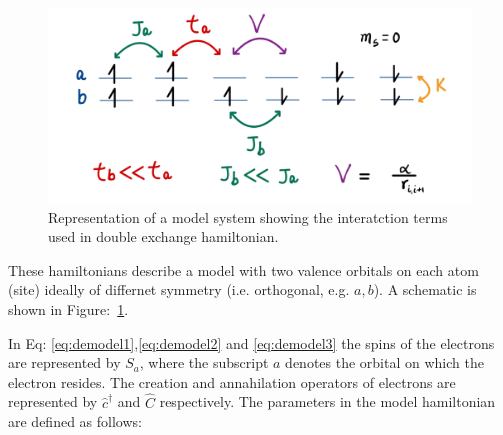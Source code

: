 \documentclass[12pt,twoside]{report}
\begin{document}
	\begin{figure}[ht]
		\centering
			\includegraphics[scale=0.2]{DE.png}
		\caption{\label{fig:deham} Representation of a model system showing the interatction terms used in double exchange hamiltonian. }
	\end{figure}
	These hamiltonians describe a model with two valence orbitals on each
	atom (site) ideally of differnet symmetry (i.e. orthogonal, e.g. $a,b$). A schematic is shown in
	Figure:~\ref{fig:deham}.
			
			
	In Eq: \ref{eq:demodel1},\ref{eq:demodel2} and \ref{eq:demodel3} the spins of the electrons are represented by $S_a$,
	where the subscript $a$ denotes the orbital on which the electron resides.  The
	creation and annahilation operators of electrons are represented by
	$\hat{c}^{\dagger}$ and $\hat{C}$ respectively. The parameters in the model
	hamiltonian are defined as follows:
	
\end{document}
